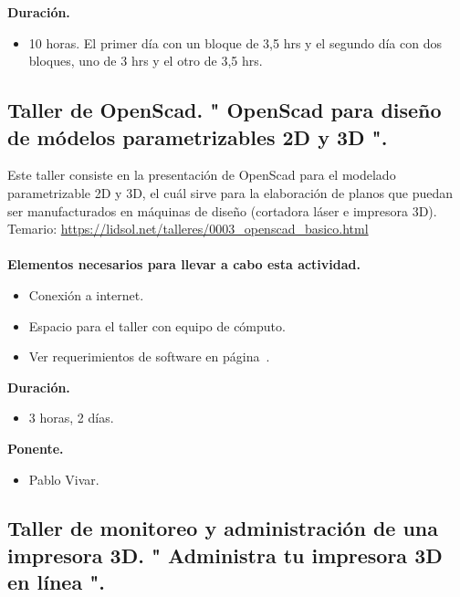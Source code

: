 \documentclass[a4paper,11pt]{article}                 %
\begin{document}
  \textbf{Duración.}
  \begin{itemize}
    \item 10 horas. El primer día con un bloque de 3,5 hrs y el segundo día con dos bloques, uno de 3 hrs y el otro de 3,5 hrs.
  \end{itemize}
  
      \subsection{Taller de OpenScad. " {OpenScad} para diseño de módelos parametrizables 2D y 3D ".}                                     %

  Este taller consiste en la presentación de OpenScad para el modelado parametrizable 2D y 3D, el cuál sirve para la elaboración de planos que puedan ser manufacturados en máquinas de diseño (cortadora láser e impresora 3D).
  Temario: \url{https://lidsol.net/talleres/0003_openscad_basico.html}
      \paragraph{}
  \textbf{Elementos necesarios para llevar a cabo esta actividad.}
  \begin{itemize}
    \label{list:openscad}
    \item Conexión a internet.
    \item Espacio para el taller con equipo de cómputo. 
    \item Ver requerimientos de software en página~\pageref{list:openscads}.
  \end{itemize}
  
  \textbf{Duración.}
  \begin{itemize}
    \item 3 horas, 2 días.
  \end{itemize}
  
            \textbf{Ponente.}
  \begin{itemize}
    \item Pablo Vivar.
  \end{itemize}
  
  
  \subsection{Taller de monitoreo y administración de una impresora 3D. " {Administra} tu impresora 3D en línea ".}                                     %
\end{document}
